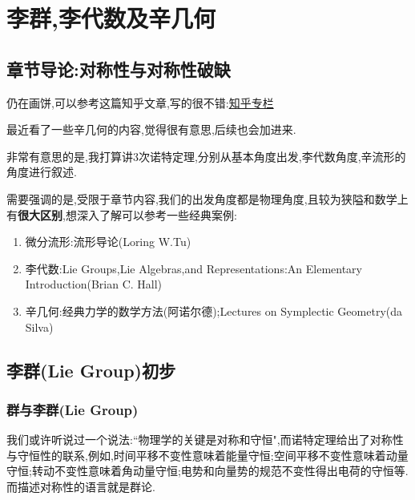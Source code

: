 \setchapterpreamble[u]{\margintoc}
\chapter{李群,李代数及辛几何}


\section*{章节导论:对称性与对称性破缺}
仍在画饼,可以参考这篇知乎文章,写的很不错:\href{https://zhuanlan.zhihu.com/p/338221764}{知乎专栏}

最近看了一些辛几何的内容,觉得很有意思,后续也会加进来.

非常有意思的是,我打算讲3次诺特定理,分别从基本角度出发,李代数角度,辛流形的角度进行叙述.

需要强调的是,受限于章节内容,我们的出发角度都是物理角度,且较为狭隘和数学上有\textbf{很大区别},想深入了解可以参考一些经典案例:
\begin{enumerate}
    \item 微分流形:流形导论(Loring W.Tu)
    \item 李代数:Lie Groups,Lie Algebras,and Representations:An Elementary Introduction(Brian C. Hall)
    \item 辛几何:经典力学的数学方法(阿诺尔德);Lectures on Symplectic Geometry(da Silva)
\end{enumerate}
\section{李群(Lie Group)初步}
\subsection{群与李群(Lie Group)}
我们或许听说过一个说法:``物理学的关键是对称和守恒",而诺特定理给出了对称性与守恒性的联系,例如,时间平移不变性意味着能量守恒;空间平移不变性意味着动量守恒;转动不变性意味着角动量守恒;电势和向量势的规范不变性得出电荷的守恒等.而描述对称性的语言就是群论.


